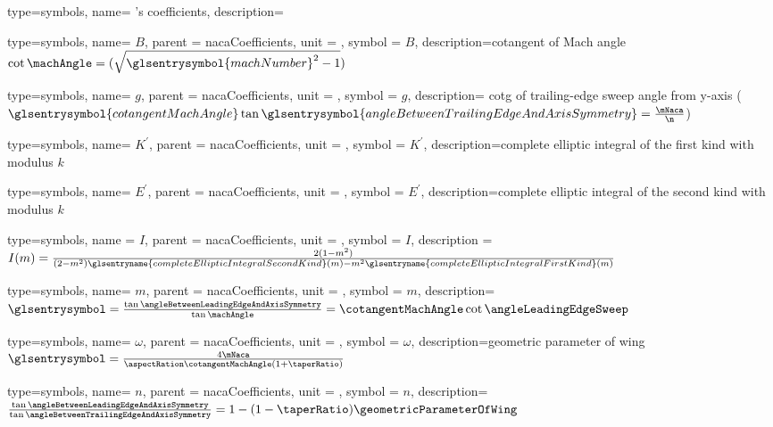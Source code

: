 {type=symbols,
  name= {'s coefficients},
  description={}
}

{type=symbols,
  name= \ensuremath{B},
  parent = {nacaCoefficients},
  unit = \unexpanded{},
  symbol = \ensuremath{B},
  description={cotangent of Mach angle $\cot{\machAngle} = (\sqrt{\glsentrysymbol{machNumber}^2-1})$}
}

{type=symbols,
  name= \ensuremath{g},
  parent = {nacaCoefficients},
  unit = \unexpanded{},
  symbol = \ensuremath{g},
  description={ cotg of trailing-edge sweep angle from y-axis ($\glsentrysymbol{cotangentMachAngle}\tan{\glsentrysymbol{angleBetweenTrailingEdgeAndAxisSymmetry}} = \frac{\mNaca}{\n}$) }
}

{type=symbols,
  name= \ensuremath{K^{\prime}},
  parent = {nacaCoefficients},
  unit = \unexpanded{},
  symbol = \ensuremath{K^{\prime}},
  description={complete elliptic integral of the first kind with modulus $k$}
}

{type=symbols,
  name= \ensuremath{E^{\prime}},
  parent = {nacaCoefficients},
  unit = \unexpanded{},
  symbol = \ensuremath{E^{\prime}},
  description={complete elliptic integral of the second kind with modulus $k$}
}

{type=symbols,
  name = \ensuremath{I},
  parent = {nacaCoefficients},
  unit = \unexpanded{},
  symbol = \ensuremath{I},
  description = {\ensuremath{I(m)=\frac{2(1-m^2)}{(2-m^2) \glsentryname{completeEllipticIntegralSecondKind}(m) - m^{2} \glsentryname{completeEllipticIntegralFirstKind}(m)}}}
}

{type=symbols,
  name= \ensuremath{m},
  parent = {nacaCoefficients},
  unit = \unexpanded{},
  symbol = \ensuremath{m},
  description={$\glsentrysymbol=\frac{\tan{\angleBetweenLeadingEdgeAndAxisSymmetry}}{\tan{\machAngle}} = \cotangentMachAngle \cot{\angleLeadingEdgeSweep}$}
}

{type=symbols,
  name= \ensuremath{\omega},
  parent = {nacaCoefficients},
  unit = \unexpanded{},
  symbol = \ensuremath{\omega},
  description={geometric parameter of wing $\glsentrysymbol=\frac{4\mNaca}{\aspectRation \cotangentMachAngle (1+\taperRatio)}$}
}


{type=symbols,
  name= \ensuremath{n},
  parent = {nacaCoefficients},
  unit = \unexpanded{},
  symbol = \ensuremath{n},
  description={$\frac{\tan{\angleBetweenLeadingEdgeAndAxisSymmetry}}{\tan{\angleBetweenTrailingEdgeAndAxisSymmetry}} = 1 - (1-\taperRatio)\geometricParameterOfWing$}
}

